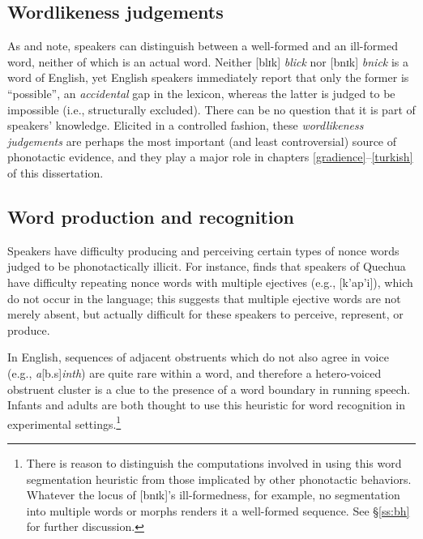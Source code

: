 \subsection{Wordlikeness judgements}

As \citet{Halle1962} and \citet{Chomsky1965} note, speakers can distinguish between a well-formed and an ill-formed word, neither of which is an actual word.
Neither [blɪk] \emph{blick} nor [bnɪk] \emph{bnick} is a word of English, yet English speakers immediately report that only the former is ``possible'', an \emph{accidental} gap in the lexicon, whereas the latter is judged to be impossible (i.e., structurally excluded).
There can be no question that it is part of speakers' knowledge.
Elicited in a controlled fashion, these \emph{wordlikeness judgements} are perhaps the most important (and least controversial) source of phonotactic evidence, and they play a major role in chapters \ref{gradience}--\ref{turkish} of this dissertation.

\subsection{Word production and recognition}
\label{ss:wpr}

Speakers have difficulty producing \citep[e.g.,][]{Davidson2006a,Davidson2010,Rose2007,Vitevitch1997} and perceiving \citep{Dupoux1999,Kabak2007a,Massaro1983} certain types of nonce words judged to be phonotactically illicit.
For instance, \citet{GallagherInPress} finds that speakers of Quechua have difficulty repeating nonce words with multiple ejectives (e.g., [k'ap'i]), which do not occur in the language; this suggests that 
multiple ejective words are not merely absent, but actually difficult for these speakers to perceive, represent, or produce.

In English, sequences of adjacent obstruents which do not also agree in voice (e.g., \emph{a}[b.s]\emph{inth}) are quite rare within a word, and therefore a hetero-voiced obstruent cluster is a clue to the presence of a word boundary in running speech.
Infants \citep[e.g.,][]{Mattys2001b} and adults \citep{McQueen1998b,Norris1997} are both thought to use this heuristic for word recognition in experimental settings.\footnote{
    There is reason to distinguish the computations involved in using this word segmentation heuristic from those implicated by other phonotactic behaviors.
    Whatever the locus of [bnɪk]'s ill-formedness, for example, no segmentation into multiple words or morphs renders it a well-formed sequence.
    See \S\ref{ss:bh} for further discussion.}

